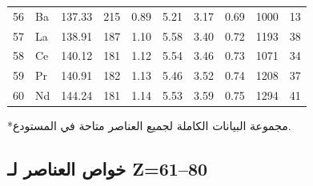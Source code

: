 \documentclass[11pt,a4paper]{article}
\begin{document}
\begin{otherlanguage}{arabic}
\begin{longtable}{p{0.6cm}p{1.2cm}p{1.2cm}p{1.2cm}p{1.2cm}p{1.2cm}p{1.5cm}p{1.2cm}p{1.2cm}p{1.2cm}}
			56 & Ba & 137.33 & 215 & 0.89 & 5.21 & 3.17 & 0.69 & 1000 & 13 \\
			57 & La & 138.91 & 187 & 1.10 & 5.58 & 3.40 & 0.72 & 1193 & 38 \\
			58 & Ce & 140.12 & 181 & 1.12 & 5.54 & 3.46 & 0.73 & 1071 & 34 \\
			59 & Pr & 140.91 & 182 & 1.13 & 5.46 & 3.52 & 0.74 & 1208 & 37 \\
			60 & Nd & 144.24 & 181 & 1.14 & 5.53 & 3.59 & 0.75 & 1294 & 41 \\
			\bottomrule
		\end{longtable}
		*مجموعة البيانات الكاملة لجميع العناصر متاحة في المستودع.
		
		\subsection*{خواص العناصر لـ Z=61–80}
		

\end{otherlanguage}
\end{document}
